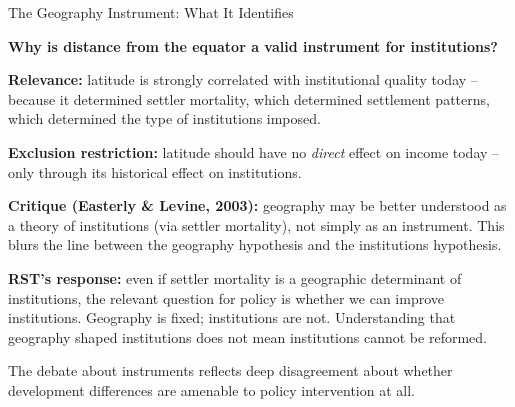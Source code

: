 \documentclass[10pt]{beamer}
\begin{document}
\begin{frame}[allowframebreaks]{The Geography Instrument: What It Identifies}

\textbf{Why is distance from the equator a valid instrument for institutions?}


\textbf{Relevance:} latitude is strongly correlated with institutional quality today -- because it determined settler mortality, which determined settlement patterns, which determined the type of institutions imposed.


\textbf{Exclusion restriction:} latitude should have no \emph{direct} effect on income today -- only through its historical effect on institutions.


\textbf{Critique (Easterly \& Levine, 2003):} geography may be better understood as a theory of institutions (via settler mortality), not simply as an instrument. This blurs the line between the geography hypothesis and the institutions hypothesis.


\textbf{RST's response:} even if settler mortality is a geographic determinant of institutions, the relevant question for policy is whether we can improve institutions. Geography is fixed; institutions are not. Understanding that geography shaped institutions does not mean institutions cannot be reformed.


\alert{The debate about instruments reflects deep disagreement about whether development differences are amenable to policy intervention at all.}
\end{frame}
\end{document}
